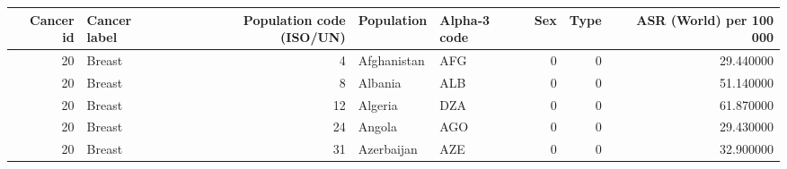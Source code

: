 \begin{tabular}{rlrllrrr}
\toprule
Cancer id & Cancer label & Population code (ISO/UN) & Population & Alpha‑3 code & Sex & Type & ASR (World) per 100 000 \\
\midrule
20 & Breast & 4 & Afghanistan & AFG & 0 & 0 & 29.440000 \\
20 & Breast & 8 & Albania & ALB & 0 & 0 & 51.140000 \\
20 & Breast & 12 & Algeria & DZA & 0 & 0 & 61.870000 \\
20 & Breast & 24 & Angola & AGO & 0 & 0 & 29.430000 \\
20 & Breast & 31 & Azerbaijan & AZE & 0 & 0 & 32.900000 \\
\bottomrule
\end{tabular}
